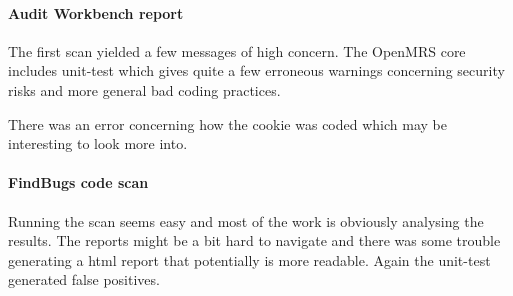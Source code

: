 \documentclass{article}
\begin{document}
\paragraph{Audit Workbench report}  

  The first scan yielded a few messages of high concern. The OpenMRS core
  includes unit-test which gives quite a few erroneous warnings concerning
  security risks and more general bad coding practices. 

  There was an error concerning how the cookie was coded which may be
  interesting to look more into.

\paragraph{FindBugs code scan}

  Running the scan seems easy and most of the work is obviously analysing the
  results. The reports might be a bit hard to navigate and there was some
  trouble generating a html report that potentially is more readable. Again the
  unit-test generated false positives.
  \newpage
\end{document}

